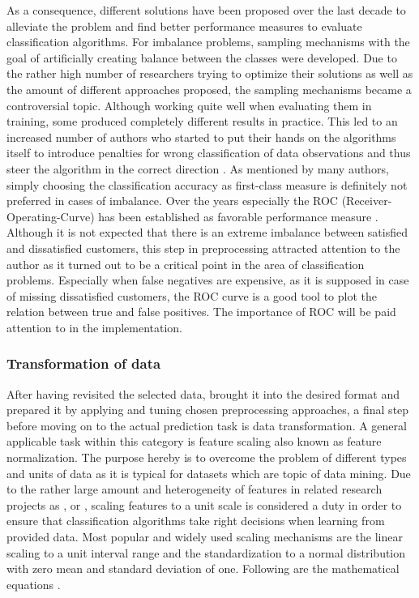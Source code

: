 \newline
\newline
As a consequence, different solutions have been proposed over the last decade to alleviate the problem and find better performance measures to evaluate classification algorithms. For imbalance problems, sampling mechanisms with the goal of artificially creating balance between the classes were developed. Due to the rather high number of researchers trying to optimize their solutions as well as the amount of different approaches proposed, the sampling mechanisms became a controversial topic. Although working quite well when evaluating them in training, some produced completely different results in practice. This led to an increased number of authors who started to put their hands on the algorithms itself to introduce penalties for wrong classification of data observations and thus steer the algorithm in the correct direction \cite{chawla2004special}. As mentioned by many authors, simply choosing the classification accuracy as first-class measure is definitely not preferred in cases of imbalance. Over the years especially the ROC (Receiver-Operating-Curve) has been established as favorable performance measure \cite{fawcett2006introduction}. Although it is not expected that there is an extreme imbalance between satisfied and dissatisfied customers, this step in preprocessing attracted attention to the author as it turned out to be a critical point in the area of classification problems. Especially when false negatives are expensive, as it is supposed in case of missing dissatisfied customers, the ROC curve is a good tool to plot the relation between true and false positives. The importance of ROC will be paid attention to in the implementation.

\subsubsection{Transformation of data}
\label{sssec:manipulationData}
After having revisited the selected data, brought it into the desired format and prepared it by applying and tuning chosen preprocessing approaches, a final step before moving on to the actual prediction task is data transformation. A general applicable task within this category is feature scaling also known as feature normalization. The purpose hereby is to overcome the problem of different types and units of data as it is typical for datasets which are topic of data mining. Due to the rather large amount and heterogeneity of features in related research projects as \cite{mozer2000predicting}, \cite{meinzer2016can} or \cite{zhao2005customer}, scaling features to a unit scale is considered a duty in order to ensure that classification algorithms take right decisions when learning from provided data. Most popular and widely used scaling mechanisms are the linear scaling to a unit interval range and the standardization to a normal distribution with zero mean and standard deviation of one. Following are the mathematical equations \cite{aksoy2001feature}. 

